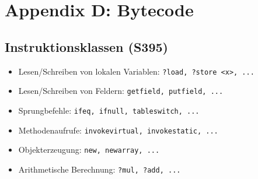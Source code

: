 \section{Appendix D: Bytecode}

\subsection{Instruktionsklassen (S395)}
\begin{itemize}
	\item Lesen/Schreiben von lokalen Variablen: \texttt{?load, ?store <x>, ...}
	\item Lesen/Schreiben von Feldern: \texttt{getfield, putfield, ...}
	\item Sprungbefehle: \texttt{ifeq, ifnull, tableswitch, ...}
	\item Methodenaufrufe: \texttt{invokevirtual, invokestatic, ...}
	\item Objekterzeugung: \texttt{new, newarray, ...}
	\item Arithmetische Berechnung: \texttt{?mul, ?add, ...}
\end{itemize}